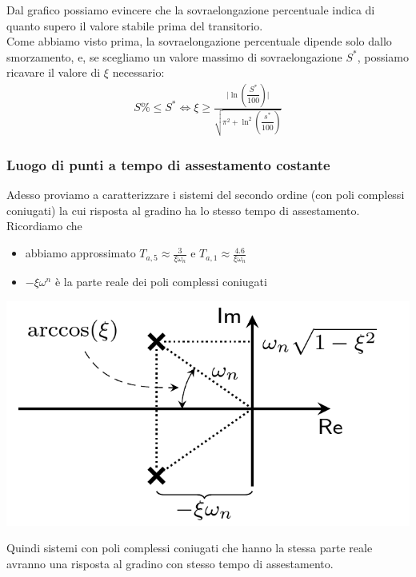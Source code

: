 \documentclass{article}
\numberwithin{equation}{subsection}
\begin{document}
Dal grafico possiamo evincere che la sovraelongazione percentuale indica di quanto supero il valore stabile prima del transitorio.\\
Come abbiamo visto prima, la sovraelongazione percentuale dipende solo dallo smorzamento, e, se scegliamo un valore massimo di sovraelongazione $S^*$, possiamo ricavare il valore di $\xi$ necessario:
\begin{align*}
    S\% \leq S^* \Longleftrightarrow \xi \geq \frac{\Bigg| \ln \left(\dfrac{S^*}{100}\right) \Bigg|}{\sqrt{\pi^2 + \ln^2 \left( \dfrac{s^*}{100}\right)}}
\end{align*}


\subsubsection{Luogo di punti a tempo di assestamento costante}
Adesso proviamo a caratterizzare i sistemi del secondo ordine (con poli complessi coniugati) la cui risposta al gradino ha lo stesso tempo di assestamento.
\vspace*{0.1cm}\\
Ricordiamo che 
\begin{itemize}
    \item abbiamo approssimato $T_{a,5} \approx \frac{3}{\xi \omega_n}$ e $T_{a,1} \approx \frac{4.6}{\xi \omega_n}$
    \item $-\xi \omega^n$ è la parte reale dei poli complessi coniugati
\end{itemize}
\begin{center}
    \includegraphics[scale=0.23]{Images/Secondo_ordine_poli_complessi.png}
\end{center}
Quindi sistemi con poli complessi coniugati che hanno la stessa parte reale avranno una risposta al gradino con stesso tempo di assestamento.
\vspace*{0.2cm}\\
\end{document}
